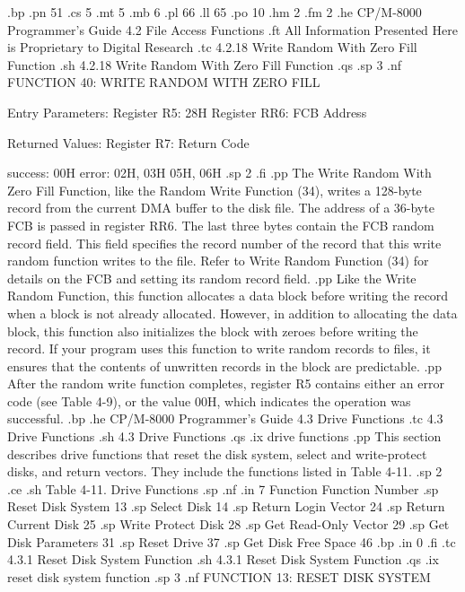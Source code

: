 .bp
.pn 51
.cs 5
.mt 5
.mb 6
.pl 66
.ll 65
.po 10
.hm 2
.fm 2
.he CP/M-8000 Programmer's Guide            4.2  File Access Functions
.ft All Information Presented Here is Proprietary to Digital Research
.tc         4.2.18  Write Random With Zero Fill Function
.sh
4.2.18  Write Random With Zero Fill Function
.qs
.sp 3
.nf
            FUNCTION 40:  WRITE RANDOM WITH ZERO FILL

              Entry Parameters:
                 Register   R5:  28H
                 Register  RR6:  FCB Address

              Returned  Values:
                 Register   R7:  Return Code
 
                                 success:  00H
                                   error:  02H, 03H
                                           05H, 06H
.sp 2
.fi
.pp
The Write Random With Zero Fill Function, like the Random Write
Function (34), writes a 128-byte record from the current DMA
buffer to the disk file.  The address of a 36-byte FCB is passed
in register  RR6. The last three bytes contain the FCB random record
field. This field specifies the record number of the record that
this write random function writes to the file. Refer to Write Random
Function (34) for details on the FCB and setting its
random record field. 
.pp
Like the Write Random Function, this function allocates a data 
block before writing the record when a block is not already allocated. 
However, in addition to allocating the data block, this 
function also initializes the block with zeroes before writing the 
record. If your program uses this function to write random records to 
files, it  
ensures that the contents of unwritten records in the block are
predictable. 
.pp
After the random write function completes, register   R5 contains
either an error code (see Table 4-9), or the value 00H, which 
indicates the operation was successful. 
.bp
.he CP/M-8000 Programmer's Guide                  4.3  Drive Functions
.tc    4.3 Drive Functions
.sh
4.3  Drive Functions
.qs
.ix drive functions
.pp 
This section describes drive functions that reset the disk system, select
and write-protect disks, and return vectors. They include the 
functions listed in Table 4-11.
.sp 2
.ce
.sh
Table 4-11.  Drive Functions
.sp 
.nf
.in 7
          Function              Function Number
.sp 
     Reset Disk System                13
.sp
     Select Disk                      14
.sp
     Return Login Vector              24
.sp
     Return Current Disk              25
.sp
     Write Protect Disk               28
.sp
     Get Read-Only Vector             29
.sp
     Get Disk Parameters              31
.sp
     Reset Drive                      37
.sp
     Get Disk Free Space              46
.bp
.in 0
.fi
.tc         4.3.1  Reset Disk System Function
.sh  
4.3.1  Reset Disk System Function
.qs
.ix reset disk system function
.sp 3
.nf
                 FUNCTION 13:  RESET DISK SYSTEM


